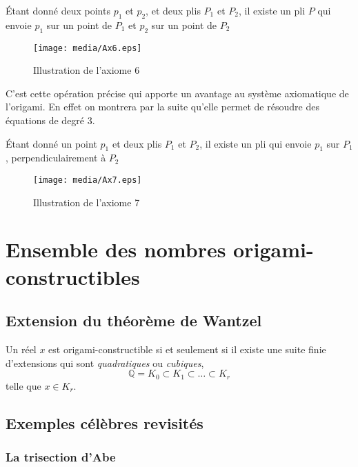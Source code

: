 \documentclass[a4paper,12pt,french,draft]{report}
\begin{document}
		
		\begin{axiome}
			Étant donné deux points $p_{1}$ et $p_{2}$, et deux plis $P_{1}$ et $P_{2}$, il existe un pli $P$ qui envoie $p_{1}$ sur un point de $P_{1}$ et $p_{2}$ sur un point de $P_{2}$
		\end{axiome}
		\begin{figure}[h]
		    \begin{center}
			\texttt{[image: media/Ax6.eps]}
		    \end{center}
			\caption{Illustration de l'axiome 6}
		\end{figure}
		 C'est cette opération précise qui apporte un avantage au système axiomatique de l'origami. En effet on montrera par la suite qu'elle permet de résoudre des équations de degré 3.
		
		
		\begin{axiome}
			Étant donné un point $p_{1}$ et deux plis $P_{1}$ et $P_{2}$, il existe un pli qui envoie $p_{1}$ sur $P_{1}$, perpendiculairement à $P_{2}$
		\end{axiome}
		\begin{figure}[h]
		    \begin{center}
			\texttt{[image: media/Ax7.eps]}
		    \end{center}
			\caption{Illustration de l'axiome 7}
		\end{figure}
	
	\section{Ensemble des nombres origami-constructibles}
	
	\subsection{Extension du théorème de Wantzel}
		\begin{theorem}
			Un réel \( x \) est origami-constructible si et seulement si il existe une suite finie d'extensions qui sont \emph{quadratiques} ou \emph{cubiques},
					\[
					\mathbb{Q} = K_0 \subset K_1 \subset \dots \subset K_r
					\]
			telle que \( x \in K_r \).
		\end{theorem}
	
	\subsection{Exemples célèbres revisités}
		\subsubsection{La trisection d'Abe}
\end{document}
